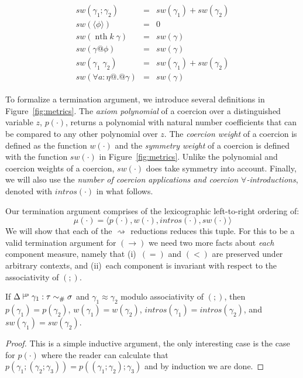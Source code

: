 \documentclass[a4paper,UKenglish]{lipics}
\makeatletter
\def\fiddle#1{\hspace*{-0.8ex}\raisebox{0.1ex}{$\scriptscriptstyle#1$}}
\newcommand{\wfco}{\vdash^{\fiddle{\sf{co}}}}
\newcommand{\psim}{\mathrel{\sim_{\tiny \#}}}
\newcommand{\nth}[2]{\mathop{nth} #1\;#2}
\newcommand{\inst}[2]{#1@#2}
\newcommand{\refl}[1]{\langle#1\rangle}  %
\newcommand{\rsa}[1]{\rightsquigarrow_{#1}}
\makeatother
\begin{document}
\begin{figure*}
\[\begin{array}{c}
\begin{array}{lcl}
      sw(\gamma_1;\gamma_2)       & = & sw(\gamma_1) + sw(\gamma_2) \\ 
      sw(\refl{\phi})     & = & 0 \\ 
      sw(\nth{k}{\gamma})   & = & sw(\gamma) \\ 
      sw(\inst{\gamma}{\phi})  & = & sw(\gamma) \\ 
      sw(\gamma_1\;\gamma_2)      & = & sw(\gamma_1) + sw(\gamma_2) \\
      sw(\forall a{:}\eta @.@ \gamma) & = & sw(\gamma)
     \end{array}
\end{array}\]\caption{Metrics on coercion terms}\label{fig:metrics}
\end{figure*}

To formalize a termination argument, we introduce several definitions in Figure~\ref{fig:metrics}. 
The {\em axiom polynomial} of a coercion over a distinguished variable $z$, $p(\cdot)$, returns a polynomial with natural number coefficients that can be compared
to any other polynomial over $z$. The {\em coercion weight} of a coercion is defined as the function $w(\cdot)$ and 
the {\em symmetry weight} of a coercion is defined with the function $sw(\cdot)$ in 
         Figure~\ref{fig:metrics}. Unlike the polynomial and coercion weights of a coercion, 
         $sw(\cdot)$ does take symmetry into account.
Finally, we will also use the {\em number of coercion applications and coercion $\forall$-introductions}, denoted with $intros(\cdot)$ in what follows.

Our termination argument comprises of the lexicographic left-to-right ordering of:
\[  \mu(\cdot) = \langle p(\cdot),w(\cdot),intros(\cdot),sw(\cdot)\rangle \]
We will show that each of the $\rsa{}$ reductions reduces this tuple.
For this to be a valid termination argument for $(\longrightarrow)$ we need two more facts about 
{\em each} component measure, namely that (i)~$(=)$ and $(<)$ are preserved under arbitrary contexts, 
and (ii)~each component is invariant with respect to the associativity of $(;)$.

\begin{lemma} If $\Delta \wfco \gamma_1 : \tau \psim \sigma$ and $\gamma_1 \approx \gamma_2$ modulo associativity 
of $(;)$, then $p(\gamma_1) = p(\gamma_2)$, $w(\gamma_1) = w(\gamma_2)$, $intros(\gamma_1) = intros(\gamma_2)$, and $sw(\gamma_1) = sw(\gamma_2)$.
\end{lemma} 
\vspace{-10pt}\begin{proof} This is a simple inductive argument, the only interesting case is the case for 
$p(\cdot)$ where the reader can calculate that $p(\gamma_1;(\gamma_2;\gamma_3)) = p((\gamma_1;\gamma_2);\gamma_3)$ and by induction we are done. 
\end{proof}
\end{document}
